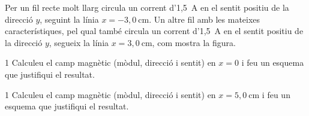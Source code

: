 Per un fil recte molt llarg circula un corrent d'1,5~A en el sentit positiu de la direcció $y$, seguint la línia $x = -3,0\ \mathrm{cm}$. Un altre fil amb les mateixes característiques, pel qual també circula un corrent d'1,5~A en el sentit positiu de la direcció $y$, segueix la línia $x = 3,0\ \mathrm{cm}$, com mostra la figura.


\begin{apartat}{1}
Calculeu el camp magnètic (mòdul, direcció i sentit) en $x = 0$ i feu un esquema que justifiqui el resultat.
\end{apartat}

\begin{apartat}{1}
Calculeu el camp magnètic (mòdul, direcció i sentit) en $x = 5,0\ \mathrm{cm}$ i feu un esquema que justifiqui el resultat.
\end{apartat}

